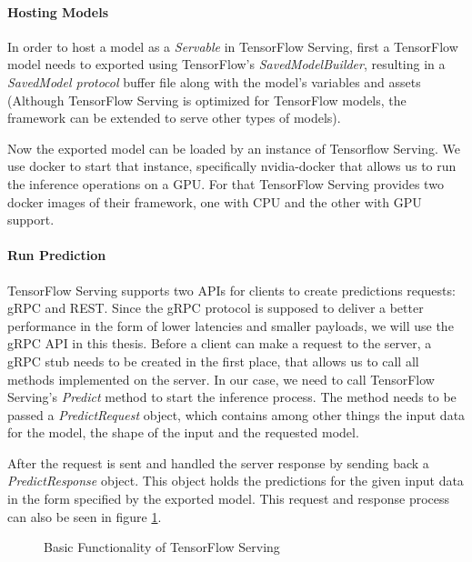 \paragraph{Hosting Models}
In order to host a model as a \emph{Servable} in TensorFlow Serving, first a TensorFlow model needs to exported using TensorFlow's \emph{SavedModelBuilder}, resulting in a \emph{SavedModel protocol} buffer file along with the model’s variables and assets (Although TensorFlow Serving is optimized for TensorFlow models, the framework can be extended to serve other types of models).

Now the exported model can be loaded by an instance of Tensorflow Serving.
We use docker to start that instance, specifically nvidia-docker that allows us to run the inference operations on a GPU. For that TensorFlow Serving provides two docker images of their framework, one with CPU and the other with GPU support.

\paragraph{Run Prediction}
TensorFlow Serving supports two APIs for clients to create predictions requests: gRPC and REST. Since the gRPC protocol is supposed to deliver a better performance in the form of lower latencies and smaller payloads, we will use the gRPC API in this thesis.
Before a client can make a request to the server, a gRPC stub needs to be created in the first place, that allows us to call all methods implemented on the server. In our case, we need to call TensorFlow Serving's \emph{Predict} method to start the inference process. The method needs to be passed a \emph{PredictRequest} object, which contains among other things the input data for the model, the shape of the input and the requested model.%

After the request is sent and handled the server response by sending back a \emph{PredictResponse} object. This object holds the predictions for the given input data in the form specified by the exported model.
This request and response process can also be seen in figure \ref{fig:cloud}.

\begin{figure}[H]
\centering

\caption{Basic Functionality of TensorFlow Serving}
\label{fig:cloud}
\end{figure}
 
